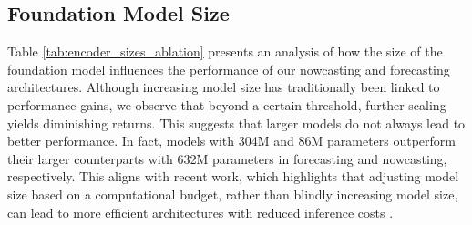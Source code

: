 \subsection{Foundation Model Size}
Table \ref{tab:encoder_sizes_ablation} presents an analysis of how the size of the foundation model influences the performance of our nowcasting and forecasting architectures. Although increasing model size has traditionally been linked to performance gains, we observe that beyond a certain threshold, further scaling yields diminishing returns. This suggests that larger models do not always lead to better performance. In fact, models with 304M and 86M parameters outperform their larger counterparts with 632M parameters in forecasting and nowcasting, respectively. This aligns with recent work, which highlights that adjusting model size based on a computational budget, rather than blindly increasing model size, can lead to more efficient architectures with reduced inference costs \cite{getting_vit_in_shape}.



